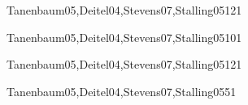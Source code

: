 \begin{syllabus}
\begin{unit}{\NCNetworkedApplicationsDef}{Tanenbaum05,Deitel04,Stevens07,Stalling05}{12}{1}
        \NCNetworkedApplicationsAllTopics
        \NCNetworkedApplicationsAllObjectives
\end{unit}

\begin{unit}{\NCNetworkManagementDef}{Tanenbaum05,Deitel04,Stevens07,Stalling05}{10}{1}
        \NCNetworkManagementAllTopics
        \NCNetworkManagementAllObjectives
\end{unit}

\begin{unit}{\NCMultimediaTechnologiesDef}{Tanenbaum05,Deitel04,Stevens07,Stalling05}{12}{1}
        \NCMultimediaTechnologiesAllTopics
        \NCMultimediaTechnologiesAllObjectives
\end{unit}

\begin{unit}{\NCMobileComputingDef}{Tanenbaum05,Deitel04,Stevens07,Stalling05}{5}{1}
        \NCMobileComputingAllTopics
        \NCMobileComputingAllObjectives
\end{unit}



\begin{coursebibliography}
\end{coursebibliography}

\end{syllabus}

%
